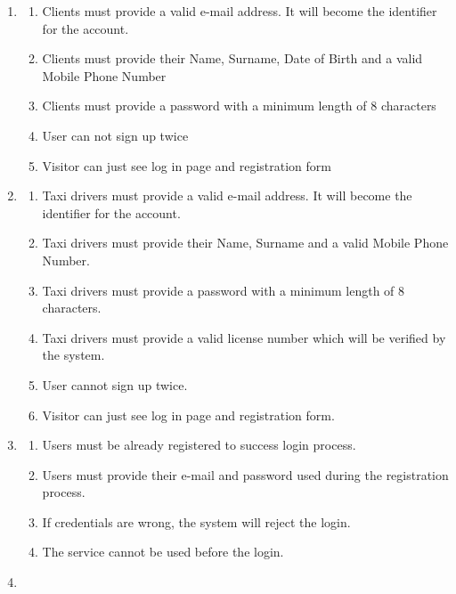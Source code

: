 \documentclass[a4paper]{article}
\begin{document}
\begin{enumerate}[label=\bfseries G\arabic*:]
    \item
        \begin{enumerate}[label=\bfseries R\arabic*:]
        \item Clients must provide a valid e-mail address. It will become the identifier for the account.
        \item Clients must provide their Name, Surname, Date of Birth and a valid Mobile Phone Number
        \item Clients must provide a password with a minimum length of 8 characters
        \item User can not sign up twice
        \item Visitor can just see log in page and registration form
        \end{enumerate}
    \item
        \begin{enumerate}[label=\bfseries R\arabic*:]
        \item Taxi drivers must provide a valid e-mail address. It will become the identifier for the account.
        \item Taxi drivers must provide their Name, Surname and a valid Mobile Phone Number.
        \item Taxi drivers must provide a password with a minimum length of 8 characters.
        \item Taxi drivers must provide a valid license number which will be verified by the system.
        \item User cannot sign up twice.
        \item Visitor can just see log in page and registration form.
        \end{enumerate}
    \item
        \begin{enumerate}[label=\bfseries R\arabic*:]
        \item Users must be already registered to success login process.
        \item Users must provide their e-mail and password used during the registration process.
        \item If credentials are wrong, the system will reject the login.
        \item The service cannot be used before the login.
        \end{enumerate}
    \item
        \begin{enumerate}[label=\bfseries R\arabic*:]

\end{enumerate}
\end{enumerate}
\end{document}
